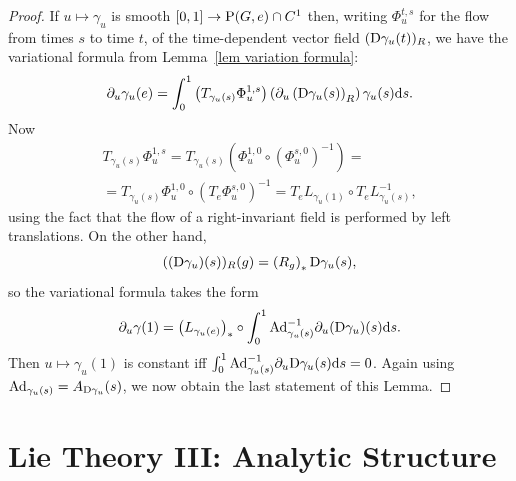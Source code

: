 \begin{proof}
    If $u\mapsto \gamma_u$ is smooth $[0,1]\to \mathrm{P}(G,e)\cap C^1$ then, writing $\Phi^{t,s}_u$ for the flow from times $s$ to time $t$, of the time-dependent vector field $(\mathrm{D}\gamma_u(t))_R$, we have the variational formula from Lemma~\ref{lem variation formula}:
    \[\partial_u\gamma_u(e)=\int_0^1 \left(T_{\gamma_u(s)}\Phi^{1,s}_u\right)\left(\partial_u \left(\mathrm{D}\gamma_u(s)\right)_R\right)\gamma_u(s){\mathrm{d}} s.\]
    Now 
    \begin{multline}
        T_{\gamma_u(s)}\Phi^{1,s}_u=T_{\gamma_u(s)}\left(\Phi_u^{1,0}\circ (\Phi^{s,0}_u)^{-1}\right)=\\=T_{\gamma_u(s)}\Phi_u^{1,0}\circ \left(T_e\Phi^{s,0}_u\right)^{-1}= T_{e}L_{\gamma_u(1)}\circ T_e L_{\gamma_u(s)}^{-1},
    \end{multline}
    using the fact that the flow of a right-invariant field is performed by left translations.  On the other hand,
    \[((\mathrm{D} \gamma_u)(s))_R(g)=\left(R_g\right)_\ast \mathrm{D}\gamma_u(s),\]
    so the variational formula takes the form
    \[\partial_u\gamma(1)=\left(L_{\gamma_u(e)}\right)_\ast\circ\int_0^1 \mathrm{Ad}_{\gamma_u(s)}^{-1}\partial_u(\mathrm{D}\gamma_u)(s){\mathrm{d}} s.\]
    Then $u\mapsto\gamma_u(1)$ is constant iff $\int_0^1\mathrm{Ad}_{\gamma_u(s)}^{-1}\partial_u\mathrm{D}\gamma_u(s){\mathrm{d}} s=0$. Again using $\mathrm{Ad}_{\gamma_u(s)}=A_{\mathrm{D} \gamma_u}(s)$, we now obtain the last statement of this Lemma.
\end{proof}















\newpage
\section{Lie Theory III: Analytic Structure}\label{sec: Lie theory iii}

